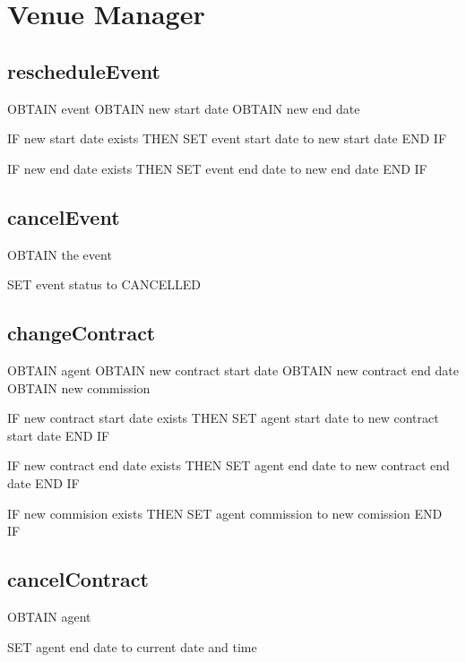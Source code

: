 \section{Venue Manager}

\subsection{rescheduleEvent}
\begin{pc}
OBTAIN event
OBTAIN new start date
OBTAIN new end date

IF new start date exists THEN
    SET event start date to new start date
END IF

IF new end date exists THEN
    SET event end date to new end date
END IF
\end{pc}

\subsection{cancelEvent}
\begin{pc}
OBTAIN the event

SET event status to CANCELLED
\end{pc}

\subsection{changeContract}
\begin{pc}
OBTAIN agent
OBTAIN new contract start date
OBTAIN new contract end date
OBTAIN new commission

IF new contract start date exists THEN
    SET agent start date to new contract start date
END IF

IF new contract end date exists THEN
    SET agent end date to new contract end date
END IF

IF new commision exists THEN
    SET agent commission to new comission
END IF
\end{pc}

\subsection{cancelContract}
\begin{pc}
OBTAIN agent

SET agent end date to current date and time
\end{pc}
